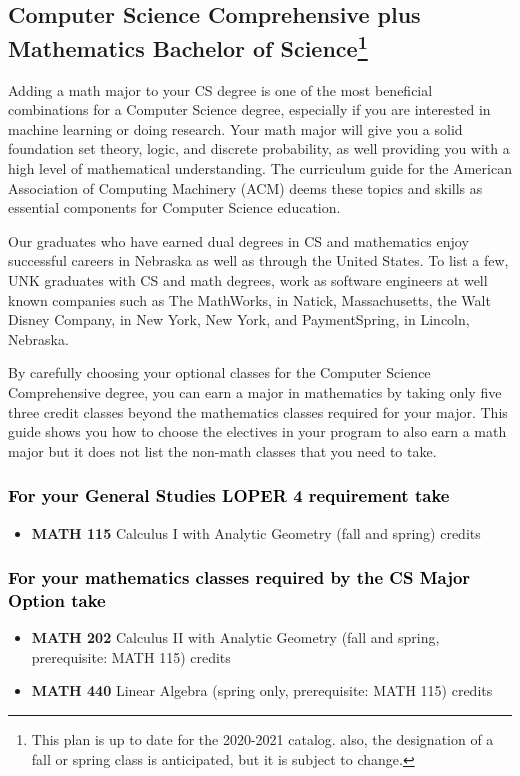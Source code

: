 \documentclass[10pt]{article}
\newcommand{\calcone}{\textbf{MATH 115} Calculus I with Analytic Geometry (fall and spring) \dotfill 5 credits}
\newcommand{\calctwo}{\textbf{MATH 202} Calculus II with Analytic Geometry (fall and spring, prerequisite: MATH 115) \dotfill 5 credits }
\newcommand{\linear}{\textbf{MATH 440} Linear Algebra (spring only, prerequisite: MATH 115) \dotfill 3 credits}
\begin{document}
\vspace{-0.1in}
\subsection*{\textbf{\textcolor{unkblue}{Computer Science Comprehensive plus Mathematics Bachelor of Science\footnote[1]{This plan is up to date for the 2020-2021 catalog. also, the designation of a fall or spring class is anticipated, but it is subject to change.
}}}}

Adding a math major to your CS degree is one of the most beneficial combinations for a Computer Science degree, especially if you are interested in machine learning or doing research.  Your math major  will give you a solid foundation set theory, logic, and discrete probability, as well providing you with a high level of mathematical understanding.   The curriculum guide for the American Association of Computing Machinery (ACM) deems  these topics and skills  as essential components for  Computer Science education.

Our graduates who have  earned dual degrees in CS and mathematics enjoy successful careers in Nebraska as well as through the United States.  To list a few, UNK graduates with CS and math degrees, work as software engineers at well known companies such as The MathWorks, in Natick, Massachusetts, the Walt Disney Company, in New York, New York, and PaymentSpring, in Lincoln, Nebraska.

By carefully choosing your optional classes for the Computer Science Comprehensive degree, you can earn a major in mathematics by taking only five three credit classes beyond the mathematics classes required for your major. This guide shows you how to choose the electives in your program to also earn a math major but it does not list the non-math classes that you need to take.



\subsubsection*{\textcolor{black}{For  your General Studies LOPER 4 requirement take}}
\begin{itemize}
\item \calcone
\end{itemize}


\subsubsection*{\textcolor{black}{For your mathematics classes required by the CS Major Option take}}
\begin{itemize}
\item \calctwo
\item \linear
\end{itemize}
\end{document}
